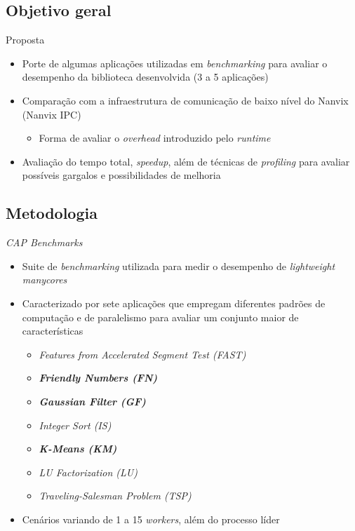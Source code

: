 \documentclass{beamer}
\begin{document}
  \subsection{Objetivo geral}
    \begin{frame}{Proposta}
      \begin{itemize}
        \item Porte de algumas aplicações utilizadas em \textit{benchmarking} para avaliar
          o desempenho da biblioteca desenvolvida (3 a 5 aplicações)
        \item Comparação com a infraestrutura de comunicação de baixo nível do Nanvix (Nanvix IPC)
        \begin{itemize}
          \item Forma de avaliar o \textit{overhead} introduzido pelo \textit{runtime}
        \end{itemize}
        \item Avaliação do tempo total, \textit{speedup}, além de técnicas de \textit{profiling}
          para avaliar possíveis gargalos e possibilidades de melhoria
      \end{itemize}
    \end{frame}

  \subsection{Metodologia}
    \begin{frame}{\textit{CAP Benchmarks}}
      \begin{itemize}
        \item Suite de \textit{benchmarking} utilizada para medir o desempenho
          de \textit{lightweight manycores}
        \item Caracterizado por sete aplicações que empregam diferentes padrões de
          computação e de paralelismo para avaliar um conjunto maior de características
        \begin{itemize}
          \item \textit{Features from Accelerated Segment Test (FAST)}
          \item \textbf{\textit{Friendly Numbers (FN)}}
          \item \textbf{\textit{Gaussian Filter (GF)}}
          \item \textit{Integer Sort (IS)}
          \item \textbf{\textit{K-Means (KM)}}
          \item \textit{LU Factorization (LU)}
          \item \textit{Traveling-Salesman Problem (TSP)}
        \end{itemize}
        \item Cenários variando de 1 a 15 \textit{workers}, além do processo líder
      \end{itemize}
    \end{frame}
\end{document}
